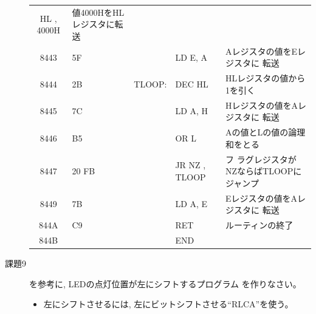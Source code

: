 \begin{description}
\begin{table}
\begin{center}
\begin{tabular}{|c|l|ll|l|}
                HL , 4000H& 値4000HをHLレジスタに転送\\
   8443 &  5F        &    &    LD E, A&Aレジスタの値をEレジスタに
                    転送\\
   8444 &  2B        &    TLOOP:& DEC HL&HLレジスタの値から1を引く\\
   8445 &  7C        &    &    LD A, H&Hレジスタの値をAレジスタに
                    転送\\
   8446 &  B5        &    &    OR L& Aの値とLの値の論理和をとる\\
   8447 &  20 FB       &    &    JR NZ , TLOOP& フ
                    ラグレジスタがNZならばTLOOPにジャンプ\\
   8449 &  7B        &    &    LD A, E& Eレジスタの値をAレジスタに
                    転送\\
   844A &  C9        &    &    RET&ルーティンの終了\\
   844B &            &    &    END&\\

\hline
\end{tabular}
\end{center}
\end{table}


\item[課題9] を参考に, LEDの点灯位置が左にシフトするプログラム
           を作りなさい。

\begin{itemize}
\item 左にシフトさせるには, 左にビットシフトさせる``RLCA''を使う。
\end{itemize}


\end{description}
